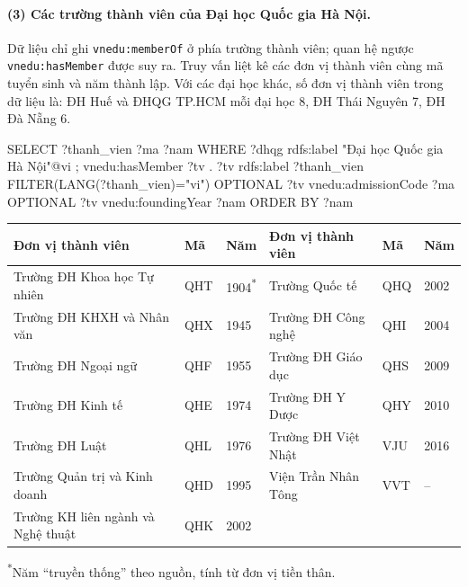 \documentclass[12pt,a4paper]{article}
\newcommand{\vn}[1]{\texttt{vnedu:\allowbreak #1}}
\begin{document}
\paragraph{(3) Các trường thành viên của Đại học Quốc gia Hà Nội.} Dữ liệu chỉ ghi \vn{memberOf} ở phía trường thành
viên; quan hệ ngược \vn{hasMember} được suy ra. Truy vấn liệt kê các đơn vị thành viên cùng mã tuyển sinh và năm thành
lập. Với các đại học khác, số đơn vị thành viên trong dữ liệu là: ĐH Huế và ĐHQG TP.HCM mỗi đại học 8, ĐH Thái Nguyên 7,
ĐH Đà Nẵng 6.
\begin{code}
SELECT ?thanh_vien ?ma ?nam WHERE {
  ?dhqg rdfs:label "Đại học Quốc gia Hà Nội"@vi ; vnedu:hasMember ?tv .
  ?tv rdfs:label ?thanh_vien FILTER(LANG(?thanh_vien)="vi")
  OPTIONAL { ?tv vnedu:admissionCode ?ma }  OPTIONAL { ?tv vnedu:foundingYear ?nam }
} ORDER BY ?nam
\end{code}
\begin{center}\small
\begin{tabular}{lll@{\hspace{1cm}}lll}
\toprule
Đơn vị thành viên & Mã & Năm & Đơn vị thành viên & Mã & Năm \\
\midrule
Trường ĐH Khoa học Tự nhiên & QHT & 1904\textsuperscript{*} & Trường Quốc tế & QHQ & 2002 \\
Trường ĐH KHXH và Nhân văn & QHX & 1945 & Trường ĐH Công nghệ & QHI & 2004 \\
Trường ĐH Ngoại ngữ & QHF & 1955 & Trường ĐH Giáo dục & QHS & 2009 \\
Trường ĐH Kinh tế & QHE & 1974 & Trường ĐH Y Dược & QHY & 2010 \\
Trường ĐH Luật & QHL & 1976 & Trường ĐH Việt Nhật & VJU & 2016 \\
Trường Quản trị và Kinh doanh & QHD & 1995 & Viện Trần Nhân Tông & VVT & -- \\
Trường KH liên ngành và Nghệ thuật & QHK & 2002 & & & \\
\bottomrule
\end{tabular}
\par\smallskip\footnotesize\textsuperscript{*}Năm ``truyền thống'' theo nguồn, tính từ đơn vị tiền thân.
\end{center}
\end{document}
